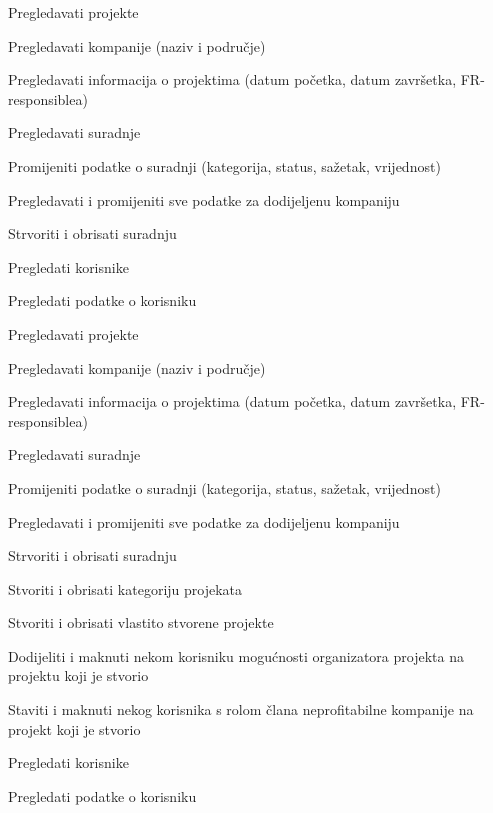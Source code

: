 \begin{packed_enum}
\begin{packed_enum}
				\end{packed_enum}

				\item  {}

				\begin{packed_enum}

					\item Pregledavati projekte
					\item Pregledavati kompanije (naziv i područje)
					\item Pregledavati informacija o projektima (datum početka, datum završetka, FR- responsiblea)
					\item Pregledavati suradnje
					\item Promijeniti podatke o suradnji (kategorija, status, sažetak, vrijednost)
					\item Pregledavati i promijeniti sve podatke za dodijeljenu kompaniju
					\item Strvoriti i obrisati suradnju
					\item Pregledati korisnike
					\item Pregledati podatke o korisniku

				\end{packed_enum}

				\item  {}

				\begin{packed_enum}

					\item Pregledavati projekte
					\item Pregledavati kompanije (naziv i područje)
					\item Pregledavati informacija o projektima (datum početka, datum završetka, FR- responsiblea)
					\item Pregledavati suradnje
					\item Promijeniti podatke o suradnji (kategorija, status, sažetak, vrijednost)
					\item Pregledavati i promijeniti sve podatke za dodijeljenu kompaniju
					\item Strvoriti i obrisati suradnju
					\item Stvoriti i obrisati kategoriju projekata
					\item Stvoriti i obrisati vlastito stvorene projekte
					\item Dodijeliti i maknuti nekom korisniku mogućnosti organizatora projekta na projektu koji je stvorio
					\item Staviti i maknuti nekog korisnika s rolom člana neprofitabilne kompanije na projekt koji je stvorio
					\item Pregledati korisnike
					\item Pregledati podatke o korisniku


\end{packed_enum}
\end{packed_enum}
